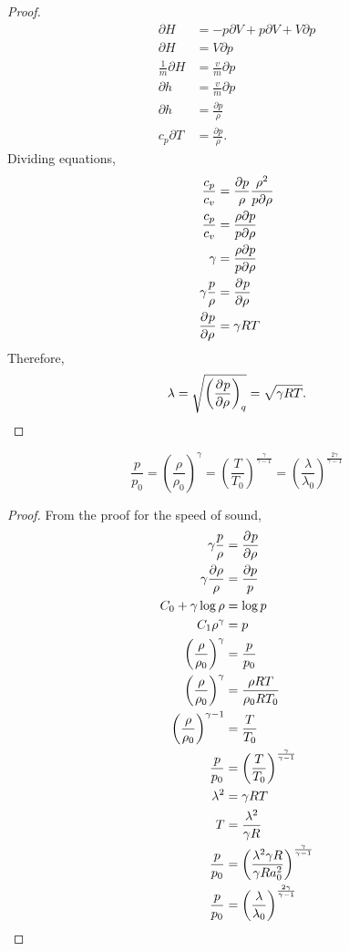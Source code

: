 \documentclass{doc}
\begin{document}
\begin{proof}
\begin{align}
    \partial H &= -p \partial V + p \partial V + V \partial p \\
    \partial H &= V \partial p \\
    \frac{1}{m} \partial H &= \frac{v}{m} \partial p \\
    \partial h &= \frac{v}{m} \partial p \\
    \partial h &= \frac{\partial p}{\rho} \\
    c_p \partial T &= \frac{\partial p}{\rho}.
\end{align}
Dividing equations,
\begin{align}
    \frac{c_p}{c_v} &=  \frac{\partial p}{\rho}  \frac{\rho^2}{p\partial \rho} \\
    \frac{c_p}{c_v} &= \frac{\rho \partial p}{p \partial\rho } \\
    \gamma &= \frac{\rho \partial p}{ p \partial\rho } \\
    \gamma \frac{p}{\rho} &= \dfrac{\partial^{} {p}}{\partial {\rho}^{} } \\
     \dfrac{\partial^{} {p}}{\partial {\rho}^{} } &= \gamma R T
\end{align}
Therefore,
\begin{equation}
    \lambda = \sqrt{\left(\dfrac{\partial^{} {p}}{\partial {\rho}^{} }\right)_{q}} = \sqrt{\gamma R T}.
\end{equation}
\end{proof}

\begin{thm}
\begin{equation}
    \frac{p}{p_0} = \left( \frac{\rho}{\rho_0} \right)^\gamma = \left( \frac{T}{T_0} \right)^\frac{\gamma}{\gamma-1} = \left( \frac{\lambda}{\lambda_0} \right)^\frac{2\gamma}{\gamma-1}
\end{equation}
\end{thm}
\begin{proof}
From the proof for the speed of sound,
\begin{align}
    \gamma \frac{p}{\rho} &= \dfrac{\partial^{} {p}}{\partial {\rho}^{} } \\
    \gamma \frac{\partial \rho}{\rho} &= \frac{\partial p}{p} \\
    C_0 + \gamma \log \rho &= \log p \\
    C_1 \rho^\gamma &= p \\
    \left( \frac{\rho}{\rho_0} \right)^\gamma &= \frac{p}{p_0} \\
    \left( \frac{\rho}{\rho_0} \right)^\gamma &= \frac{\rho R T}{\rho_0 R T_0} \\
    \left( \frac{\rho}{\rho_0} \right)^{\gamma-1} &= \frac{T}{T_0} \\
    \frac{p}{p_0} &= \left( \frac{T}{T_0} \right)^\frac{\gamma}{\gamma-1} \\
    \lambda^2 &= \gamma R T \\
    T &= \frac{\lambda^2}{\gamma R} \\
    \frac{p}{p_0} &= \left( \frac{\lambda^2 \gamma R}{ \gamma R a_0^2} \right)^\frac{\gamma}{\gamma-1} \\
    \frac{p}{p_0} &= \left( \frac{\lambda}{\lambda_0} \right)^\frac{2\gamma}{\gamma-1}
\end{align}
\end{proof}
\end{document}
